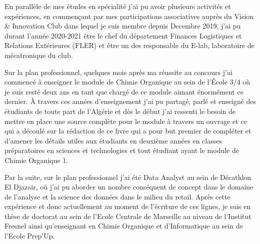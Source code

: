 \documentclass[a4paper, oneside]{book}
\begin{document}
En parallèle de mes études en spécialité j'ai pu avoir plusieurs activités et expériences, en commençant par mes participations associatives auprès du Vision \& Innovation Club dans lequel je suis membre depuis Decembre 2019, j'ai pu durant l'année 2020-2021 être le chef du département Finances Logistiques et Relations Extérieures (FLER) et être un des responsable du E-lab, laboratoire de mécatronique du club. 

Sur la plan professionnel, quelques mois après ma réussite au concours j'ai commencé à enseigner le module de Chimie Organique au sein de l'\'Ecole 3/4 où je suis resté deux ans en tant que chargé de ce module aimant énormément ce dernier. À travers ces années d'enseignement j'ai pu partagé, parlé et enseigné des étudiants de toute part de l'Algérie et dès le début j'ai ressenti le besoin de mettre en place une source complète pour le module à travers un ouvrage et ce qui a découlé sur la rédaction de ce livre qui a pour but premier de compléter et d'amener les détails utiles aux étudiants en deuxième années en classes préparatoires en sciences et technologies et tout étudiant ayant le module de Chimie Organique 1.

Par la suite, sur le plan professionnel j'ai été Data Analyst au sein de Décathlon El Djazair, où j'ai pu aborder un nombre conséquent de concept dans le domaine de l'analyse et la science des données dans le milieu du retail. Après cette expérience et donc actuellement au moment de l'écriture de ces lignes, je suis en thèse de doctorat au sein de l'Ecole Centrale de Marseille au niveau de l'Institut Fresnel ainsi qu'enseignant en Chimie Organique et d'Informatique au sein de l'Ecole Prep'Up. 

\vspace*{\fill}
\mainmatter
\large  
\renewcommand{\contentsname}{Sommaire}
\renewcommand\listfigurename{Liste des figures}
\renewcommand\listtablename{Liste des tableaux}
\setcounter{tocdepth}{3}
\dominitoc
{}
\tableofcontents
\listoffigures
\listoftables
\end{document}

